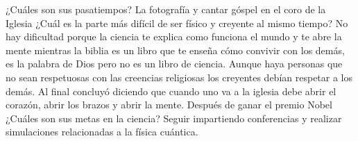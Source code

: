 \documentclass[10pt,letterpaper]{report}
\begin{document}
¿Cuáles son sus pasatiempos?
La fotografía y cantar góspel en el coro de la Iglesia
¿Cuál es la parte más difícil de ser físico y creyente al mismo tiempo?
No hay dificultad porque la ciencia te explica como funciona el mundo y te abre la mente mientras la biblia es un libro que te enseña cómo convivir con los demás, es la palabra de Dios pero no es un libro de ciencia. Aunque haya personas que no sean respetuosas con las creencias religiosas los creyentes debían respetar a los demás. Al final concluyó diciendo que cuando uno va a la iglesia debe abrir el corazón, abrir los brazos y abrir la mente.
Después de ganar el premio Nobel ¿Cuáles son sus metas en la ciencia?
Seguir impartiendo conferencias y realizar simulaciones relacionadas a la física cuántica.
\end{document}
